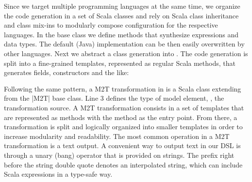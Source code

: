 Since we target multiple programming languages at the same time, we organize the code generation in a set of Scala classes and rely on Scala class inheritance and class mix-ins to modularly compose configuration for the respective languages.
In the base class \href{https://github.com/fikovnik/ttc14-fixml-sigma/blob/master/ttc14-fixml-base/src/fr/inria/spirals/sigma/ttc14/fixml/BaseObjLangMTT.scala}{} we define methods that synthesize expressions and data types.
The default (Java) implementation can be then easily overwritten by other languages.
Next we abstract a class generation into \href{https://github.com/fikovnik/ttc14-fixml-sigma/blob/master/ttc14-fixml-base/src/fr/inria/spirals/sigma/ttc14/fixml/BaseObjLang2Class.scala}{}.
The code generation is split into a fine-grained templates, represented as regular Scala methods, that generates fields, constructors and the like:
%
%
Following the same pattern, a M2T transformation in \SIGMA is a Scala class extending from the \Scala|M2T| base class.
Line 3 defines the type of model element, \Ie, the transformation source.
A M2T transformation consists in a set of templates that are represented as methods with the  method as the entry point.
From there, a transformation is split and logically organized into smaller templates in order to increase modularity and readability.
%
The most common operation in a M2T transformation is a text output.
A convenient way to output text in our DSL is through a unary \Scala{!} (bang) operator that is provided on strings.
The prefix  right before the string double quote denotes an interpolated string, which can include Scala expressions in a type-safe way.

